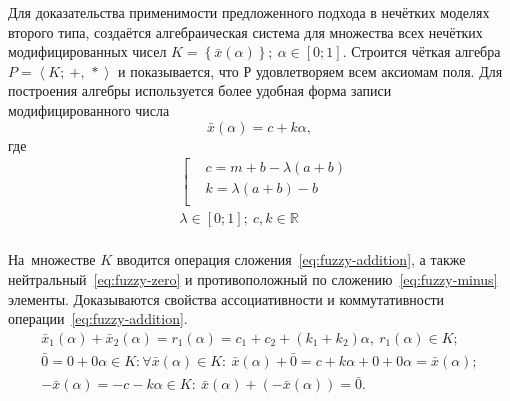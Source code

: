 Для доказательства применимости предложенного подхода в нечётких моделях второго типа, создаётся алгебраическая система для множества всех нечётких модифицированных чисел $K=\left\{ \bar{x}\left( \alpha  \right) \right\};\ \alpha \in \left[ 0;1 \right]$. Строится чёткая алгебра $P=\left\langle K ;\ +,\,* \right\rangle$ и показывается, что $Р$ удовлетворяем всем аксиомам поля. Для построения алгебры используется более удобная форма записи модифицированного числа
\begin{equation}
\label{eq:modified-number-base}
  \bar{x}\left( \alpha  \right)=c+k\alpha,
\end{equation}
где
\begin{equation}
\label{eq:modified-number-from-abm}
  \begin{aligned}
    & \left[ \begin{aligned}
    & c=m+b-\lambda \left( a+b \right) \\ 
    & k=\lambda \left( a+b \right)-b \\ 
  \end{aligned} \right. \\ 
  & \lambda \in \left[ 0;1 \right];\ c,k\in \mathbb{R} \\ 
\end{aligned}
\end{equation}

На~множестве $K$ вводится операция сложения~\eqref{eq:fuzzy-addition}, а также нейтральный~\eqref{eq:fuzzy-zero} и противоположный по сложению~\eqref{eq:fuzzy-minus} элементы. Доказываются свойства ассоциативности и коммутативности операции~\eqref{eq:fuzzy-addition}.
\begin{gather}
  \label{eq:fuzzy-addition}
  \bar{x}_1\left(\alpha \right)+\bar{x}_2\left(\alpha \right)=r_1\left( \alpha  \right)=c_1+c_2+\left(k_1+k_2 \right)\alpha,\ r_1 \left( \alpha  \right)\in K;\\
  \label{eq:fuzzy-zero}
  \bar{0}=0+0\alpha \in K: \forall \bar{x}(\alpha )\in K:\ \bar{x}(\alpha )+\bar{0}=c+k\alpha +0+0\alpha =\bar{x}(\alpha );\\
  \label{eq:fuzzy-minus}
  -\bar{x}\left(\alpha \right)=-c-k\alpha \in K:\ \bar{x}\left( \alpha  \right)+\left( -\bar{x}\left( \alpha  \right) \right)=\bar{0}. 
\end{gather}

